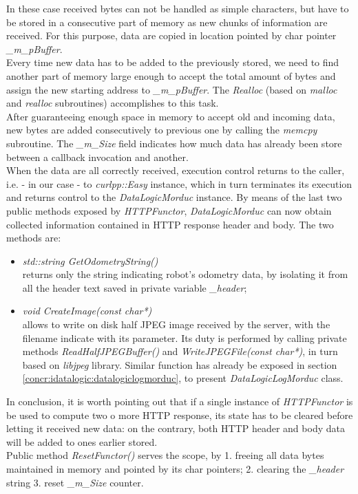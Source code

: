 In these case received bytes can not be handled as simple characters,
but have to be stored in a consecutive part of memory as new chunks
of information are received. For this purpose, data are copied in location
pointed by char pointer \textit{\_m\_pBuffer}.
\\
Every time new data has to be added to the previously stored, we need
to find another part of memory large enough to accept the total amount of
bytes and assign the new starting address to \textit{\_m\_pBuffer}. The
\textit{Realloc} (based on \textit{malloc} and \textit{realloc} subroutines)
accomplishes to this task.
\\
After guaranteeing enough space in memory to accept old and incoming data,
new bytes
are added consecutively to previous one by calling the \textit{memcpy}
subroutine. The \textit{\_m\_Size} field indicates how much data
has already been store between a callback invocation and another.
\\
When the data are all correctly received, execution control returns to the
caller, i.e. - in our case - to \textit{curlpp::Easy} instance, which
in turn terminates its execution and returns control to the
\textit{DataLogicMorduc} instance. By means
of the last two public methods exposed by \textit{HTTPFunctor},
\textit{DataLogicMorduc}
can now obtain collected information contained in HTTP response header and
body. The two methods are:

\begin{itemize}

  \item \textit{std::string GetOdometryString()} \\
    returns only the string indicating robot's odometry data,
    by isolating it from all the header text saved in private
    variable \textit{\_header};

  \item \textit{void CreateImage(const char*)} \\
    allows to write on disk half JPEG image received
    by the server, with the filename indicate with its parameter.
    Its duty is performed by calling private methods
    \textit{ReadHalfJPEGBuffer()} and \textit{WriteJPEGFile(const char*)},
    in turn based on \textit{libjpeg} library. Similar function has
    already be exposed in section \ref{concr:idatalogic:datalogiclogmorduc},
    to present \textit{DataLogicLogMorduc} class.

\end{itemize}

In conclusion, it is worth pointing out that if a single instance of
\textit{HTTPFunctor} is be used to compute two o more HTTP response,
its state has to be cleared before letting it received new data: on the contrary,
both HTTP header and body data will be added to ones earlier stored.
\\
Public method \textit{ResetFunctor()} serves the scope, by 1. freeing all
data bytes maintained in memory and pointed by its char pointers; 2. clearing the
\textit{\_header} string 3. reset \textit{\_m\_Size} counter.

